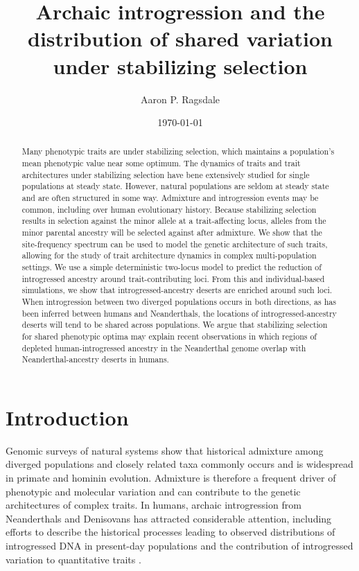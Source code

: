 \documentclass{article}
\title{Archaic introgression and the distribution
of shared variation under stabilizing selection}
\author[]{Aaron P. Ragsdale}
\affil[]{apragsdale@wisc.edu}
\affil[]{Department of Integrative Biology, University of Wisconsin--Madison, WI, USA}
\date{\today}
\begin{document}
\maketitle


\begin{abstract}
    
    Many phenotypic traits are under stabilizing selection, which maintains a
    population's mean phenotypic value near some optimum. The dynamics of
    traits and trait architectures under stabilizing selection have bene
    extensively studied for single populations at steady state. However,
    natural populations are seldom at steady state and are often structured in
    some way. Admixture and introgression events may be common, including over
    human evolutionary history. Because stabilizing selection results in
    selection against the minor allele at a trait-affecting locus, alleles from
    the minor parental ancestry will be selected against after admixture. We
    show that the site-frequency spectrum can be used to model the genetic
    architecture of such traits, allowing for the study of trait architecture
    dynamics in complex multi-population settings. We use a simple
    deterministic two-locus model to predict the reduction of introgressed
    ancestry around trait-contributing loci. From this and individual-based
    simulations, we show that introgressed-ancestry deserts are enriched around
    such loci. When introgression between two diverged populations occurs in
    both directions, as has been inferred between humans and Neanderthals, the
    locations of introgressed-ancestry deserts will tend to be shared across
    populations. We argue that stabilizing selection for shared phenotypic
    optima may explain recent observations in which regions of depleted
    human-introgressed ancestry in the Neanderthal genome overlap with
    Neanderthal-ancestry deserts in humans.

\end{abstract}

\onehalfspacing

\section*{Introduction}

Genomic surveys of natural systems show that historical admixture among
diverged populations and closely related taxa commonly occurs
\citep{brandvain2014speciation, skoglund2015ancient, suvorov2022widespread} and
is widespread in primate \citep{tung2017contribution, sorensen2023genome} and
hominin \citep{wolf2018outstanding, peter2020100} evolution. Admixture is
therefore a frequent driver of phenotypic and molecular variation and can
contribute to the genetic architectures of complex traits. In humans, archaic
introgression from Neanderthals and Denisovans has attracted considerable
attention, including efforts to describe the historical processes leading to
observed distributions of introgressed DNA in present-day populations
\citep{prufer2014complete, villanea2019multiple, chen2020identifying} and the
contribution of introgressed variation to quantitative traits
\citep{sankararaman2016combined, wei2023lingering}.
\end{document}
